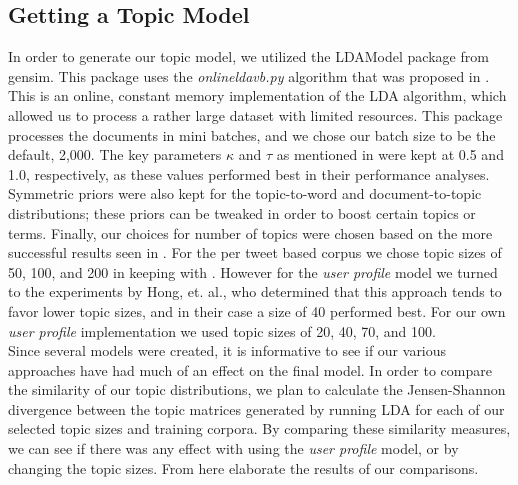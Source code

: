 \documentclass{acm_proc_article-sp}
\begin{document}
\subsection{Getting a Topic Model}
\hspace*{5mm}In order to generate our topic model, we utilized the LDAModel package from gensim. This package uses the \textit{onlineldavb.py} algorithm that was proposed in \cite{hoffman2010online}. This is an online, constant memory implementation of the LDA algorithm, which allowed us to process a rather large dataset with limited resources. This package processes the documents in mini batches, and we chose our batch size to be the default, 2,000. The key parameters $\kappa$ and $\tau$ as mentioned in \cite{hoffman2010online} were kept at 0.5 and 1.0, respectively, as these values performed best in their performance analyses. Symmetric priors were also kept for the topic-to-word and document-to-topic distributions; these priors can be tweaked in order to boost certain topics or terms. Finally, our choices for number of topics were chosen based on the more successful results seen in \cite{hong2010empirical}. For the per tweet based corpus we chose topic sizes of 50, 100, and 200 in keeping with \cite{godin2013using}. However for the \textit{user profile} model we turned to the experiments by Hong, et. al., who determined that this approach tends to favor lower topic sizes, and in their case a size of 40 performed best. For our own \textit{user profile} implementation we used topic sizes of 20, 40, 70, and 100.\\ 
\hspace*{5mm}Since several models were created, it is informative to see if our various approaches have had much of an effect on the final model. In order to compare the similarity of our topic distributions, we plan to calculate the Jensen-Shannon divergence between the topic matrices generated by running LDA for each of our selected topic sizes and training corpora. By comparing these similarity measures, we can see if there was any effect with using the \textit{user profile} model, or by changing the topic sizes. From here elaborate the results of our comparisons.\\
\end{document}
